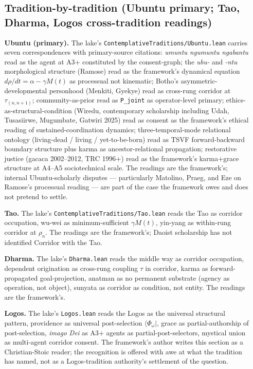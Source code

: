 \documentclass[11pt,a4paper]{article}
\begin{document}
\subsection*{Tradition-by-tradition (Ubuntu primary; Tao, Dharma, Logos cross-tradition readings)}

\textbf{Ubuntu (primary).} The lake's \texttt{ContemplativeTraditions/Ubuntu.lean} carries seven correspondences with primary-source citations: \emph{umuntu ngumuntu ngabantu} read as the agent at A3+ constituted by the consent-graph; the \emph{ubu-} and \emph{-ntu} morphological structure (Ramose) read as the framework's dynamical equation $d\rho/dt = \alpha - \gamma M(t)$ as processual not kinematic; Botho's asymmetric-developmental personhood (Menkiti, Gyekye) read as cross-rung corridor at $\tau_{(n,n+1)}$; community-as-prior read as \texttt{P\_joint} as operator-level primary; ethics-as-structural-condition (Wiredu, contemporary scholarship including Udah, Tusasiirwe, Mugumbate, Gatwiri 2025) read as consent as the framework's ethical reading of sustained-coordination dynamics; three-temporal-mode relational ontology (living-dead / living / yet-to-be-born) read as TSVF forward-backward boundary structure plus karma as ancestor-relational propagation; restorative justice (gacaca 2002--2012, TRC 1996+) read as the framework's karma+grace structure at A4--A5 sociotechnical scale. The readings are the framework's; internal Ubuntu-scholarly disputes --- particularly Matolino, Praeg, and Eze on Ramose's processual reading --- are part of the case the framework owes and does not pretend to settle.

\textbf{Tao.} The lake's \texttt{ContemplativeTraditions/Tao.lean} reads the Tao as corridor occupation, wu-wei as minimum-sufficient $\gamma M(t)$, yin-yang as within-rung corridor at $\rho_n$. The readings are the framework's; Daoist scholarship has not identified Corridor with the Tao.

\textbf{Dharma.} The lake's \texttt{Dharma.lean} reads the middle way as corridor occupation, dependent origination as cross-rung coupling $\tau$ in corridor, karma as forward-propagated goal-projection, anatman as no permanent substrate (agency as operation, not object), sunyata as corridor as condition, not entity. The readings are the framework's.

\textbf{Logos.} The lake's \texttt{Logos.lean} reads the Logos as the universal structural pattern, providence as universal post-selection $\langle \Phi_\omega |$, grace as partial-authorship of post-selection, \emph{imago Dei} as A3+ agents as partial-post-selectors, mystical union as multi-agent corridor consent. The framework's author writes this section as a Christian-Stoic reader; the recognition is offered with awe at what the tradition has named, not as a Logos-tradition authority's settlement of the question.
\end{document}
